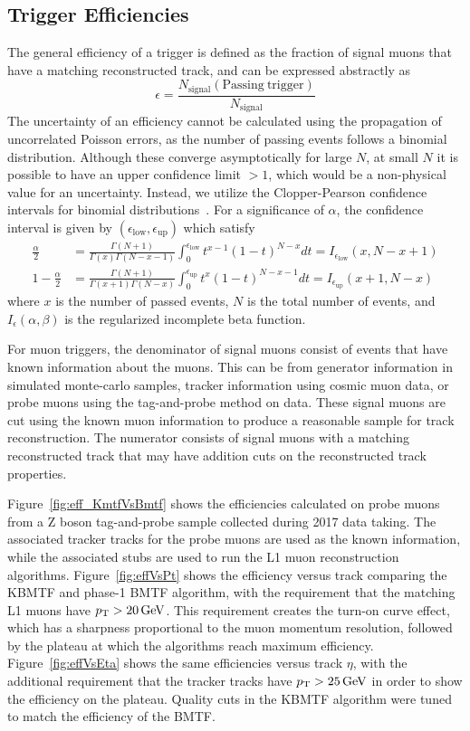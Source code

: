 \subsection{Trigger Efficiencies} \label{sec:kmtf_eff}
The general efficiency of a trigger is defined as the fraction of signal muons that have a matching reconstructed track, and can be expressed abstractly as
\begin{equation}\label{eq:eff}
	\epsilon=\frac{N_\mathrm{signal}(\mathrm{Passing\ trigger})}{N_\mathrm{signal}}	
\end{equation}
The uncertainty of an efficiency cannot be calculated using the propagation of uncorrelated Poisson errors, as the number of passing events follows a binomial distribution. Although these converge asymptotically for large $N$, at small $N$ it is possible to have an upper confidence limit $>1$, which would be a non-physical value for an uncertainty. Instead, we utilize the Clopper-Pearson confidence intervals for binomial distributions~\cite{clopperpearson}. For a significance of $\alpha$, the confidence interval is given by $(\epsilon_\text{low}, \epsilon_\text{up})$ which satisfy
\begin{align}
		\frac{\alpha}{2}&=\frac{\Gamma(N+1)}{\Gamma(x)\Gamma(N-x-1)}\int_{0}^{\epsilon_\text{low}}t^{x-1}(1-t)^{N-x}dt=I_{\epsilon_\text{low}}(x,N-x+1)\\
		1-\frac{\alpha}{2}&=\frac{\Gamma(N+1)}{\Gamma(x+1)\Gamma(N-x)}\int_{0}^{\epsilon_\text{up}}t^x(1-t)^{N-x-1}dt=I_{\epsilon_\text{up}}(x+1,N-x)
\end{align}
where $x$ is the number of passed events, $N$ is the total number of events, and $I_\epsilon(\alpha,\beta)$ is the regularized incomplete beta function.

For muon triggers, the denominator of signal muons consist of events that have known information about the muons. This can be from generator information in simulated monte-carlo samples, tracker information using cosmic muon data, or probe muons using the tag-and-probe method on data. These signal muons are cut using the known muon information to produce a reasonable sample for track reconstruction. The numerator consists of signal muons with a matching reconstructed track that may have addition cuts on the reconstructed track properties.

Figure~\ref{fig:eff_KmtfVsBmtf} shows the efficiencies calculated on probe muons from a Z boson tag-and-probe sample collected during 2017 data taking. The associated tracker tracks for the probe muons are used as the known information, while the associated stubs are used to run the L1 muon reconstruction algorithms. Figure~\ref{fig:effVsPt} shows the efficiency versus track \pt comparing the KBMTF and phase-1 BMTF algorithm, with the requirement that the matching L1 muons have $p_{\mathrm{T}}>20\,\text{Ge\hspace{-.08em}V}$. This requirement creates the turn-on curve effect, which has a sharpness proportional to the muon momentum resolution, followed by the plateau at which the algorithms reach maximum efficiency. Figure~\ref{fig:effVsEta} shows the same efficiencies versus track $\eta$, with the additional requirement that the tracker tracks have $p_{\mathrm{T}}>25\,\text{Ge\hspace{-.08em}V}$ in order to show the efficiency on the plateau. Quality cuts in the KBMTF algorithm were tuned to match the efficiency of the BMTF.

